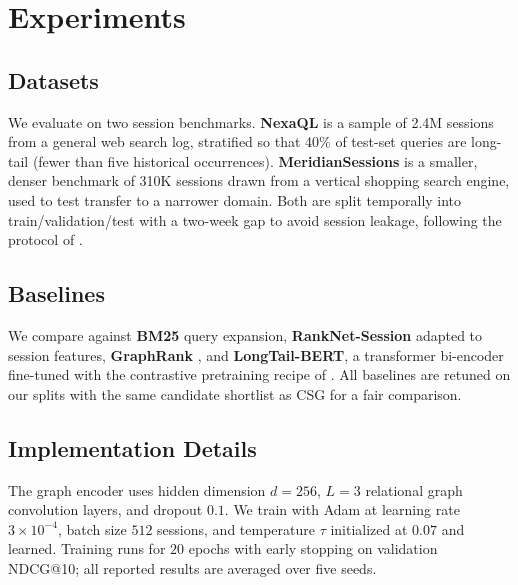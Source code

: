 \section{Experiments}
\label{sec:experiments}

\subsection{Datasets}

We evaluate on two session benchmarks. \textbf{NexaQL} is a sample of 2.4M sessions
from a general web search log, stratified so that 40\% of test-set queries are
long-tail (fewer than five historical occurrences). \textbf{MeridianSessions} is a
smaller, denser benchmark of 310K sessions drawn from a vertical shopping search
engine, used to test transfer to a narrower domain. Both are split temporally into
train/validation/test with a two-week gap to avoid session leakage, following the
protocol of \citet{Delacroix2020Evaluation}.

\subsection{Baselines}

We compare against \textbf{BM25} query expansion, \textbf{RankNet-Session}
\citep{Whitfield2016RankNet} adapted to session features, \textbf{GraphRank}
\citep{Rajan2021GraphRank}, and \textbf{LongTail-BERT}, a transformer bi-encoder
fine-tuned with the contrastive pretraining recipe of
\citet{Lindqvist2020Contrastive}. All baselines are retuned on our splits with the
same candidate shortlist as CSG for a fair comparison.

\subsection{Implementation Details}

The graph encoder uses hidden dimension $d{=}256$, $L{=}3$ relational graph
convolution layers, and dropout $0.1$. We train with Adam at learning rate
$3\times10^{-4}$, batch size $512$ sessions, and temperature $\tau$ initialized at
$0.07$ and learned. Training runs for $20$ epochs with early stopping on validation
NDCG@10; all reported results are averaged over five seeds.
